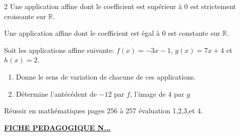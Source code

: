 \begin{multicols*}{2}
 	 Une application affine dont le coefficient est supérieur  à 0 est strictement croissante sur $\mathbb{R}$.
 	
 	 Une application affine dont le coefficient est égal à 0 est constante sur $\mathbb{R}$.
 	
 	Soit les applications affine suivante: $ f(x)=-3x-1 $, $ g(x)=7x+4 $ et $ h(x)=2$.
 	\begin{enumerate}
 		\item Donne le sens de variation de chacune de ces applications.
 		\item Détermine l'antécédent de $-12$ par $f$, l'image de $4$ par $ g $
 	\end{enumerate}
 	\dure 
 	\reto 
 	\begin{center}
 	\end{center}
 	Réussir en mathématiques pages 256 à 257 évaluation 1,2,3,et 4.
 	\doc
 \end{multicols*} 	
  \newpage
 \begin{center}
 	\underline{\textbf{\Large FICHE PEDAGOGIQUE N...}}
 \end{center}
